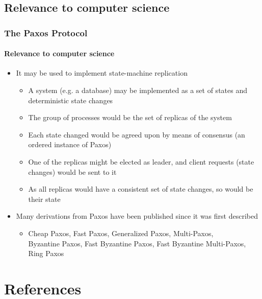 \documentclass[10 pt]{beamer}
\begin{document}
\subsection{Relevance to computer science}


\begin{frame}
  \frametitle{The \textbf{Paxos} Protocol}
  \framesubtitle{Relevance to computer science}
  
  \begin{itemize}
    \item It may be used to implement state-machine replication
    \begin{itemize}
      \item A system (e.g. a database) may be implemented as a set of states and deterministic state changes
      \item The group of processes would be the set of replicas of the system
      \item Each state changed would be agreed upon by means of consensus (an ordered instance of Paxos)
      \item One of the replicas might be elected as leader, and client requests (state changes) would be sent to it
      \item As all replicas would have a consistent set of state changes, so would be their state
    \end{itemize} 
  \end{itemize}
  
  \vspace{2 mm}
  \begin{itemize}
    \item Many derivations from Paxos have been published since it was first described
    \begin{itemize}
      \item Cheap Paxos, Fast Paxos, Generalized Paxos, Multi-Paxos,\\
      Byzantine Paxos, Fast Byzantine Paxos, Fast Byzantine Multi-Paxos, Ring Paxos
    \end{itemize} 
  \end{itemize}

\end{frame}



\section*{References}
\end{document}
